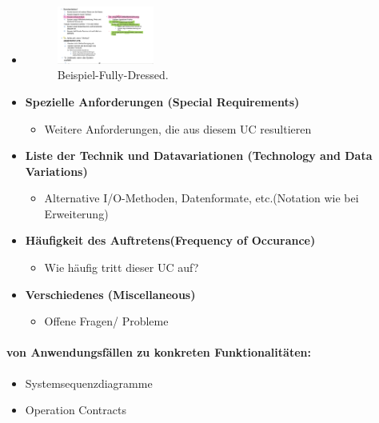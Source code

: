 \documentclass[../ZF_SWEN1.tex]{subfiles}
\begin{document}
\begin{enumerate}
\begin{itemize}
		\item 			\begin{figure}[H]
			\centering
			\includegraphics[width=0.3\textwidth]{Resources/Images/Beispiel-Fully-Dressed.png}
			\caption{\label{fig:Beispiel-Fully-Dressed}Beispiel-Fully-Dressed.}
		\end{figure}
	\item 
	\begin{large}
		\colorbox{teal!30}{\textbf{Spezielle Anforderungen (Special Requirements)}}
	\end{large}
	\begin{itemize}
		\item Weitere Anforderungen, die aus diesem UC resultieren
	\end{itemize}
	\item 
		\begin{large}
			\colorbox{teal!30}{\textbf{Liste der Technik und Datavariationen (Technology and Data Variations)}}
		\end{large}
	\begin{itemize}
		\item Alternative I/O-Methoden, Datenformate, etc.(Notation wie bei Erweiterung)
	\end{itemize}
	\item 
	\begin{large}
		\colorbox{teal!30}{\textbf{Häufigkeit des Auftretens(Frequency of Occurance)}}
	\end{large}
	\begin{itemize}
		\item Wie häufig tritt dieser UC auf?
	\end{itemize}
	\item 
	\begin{large}
		\colorbox{teal!30}{\textbf{Verschiedenes (Miscellaneous)}}
	\end{large}
	\begin{itemize}
		\item Offene Fragen/ Probleme
	\end{itemize}
\end{itemize}
		
\end{enumerate}
\paragraph{von Anwendungsfällen zu konkreten Funktionalitäten:}
\begin{itemize}
	\item Systemsequenzdiagramme
	\item Operation Contracts
\end{itemize}
\end{document}
